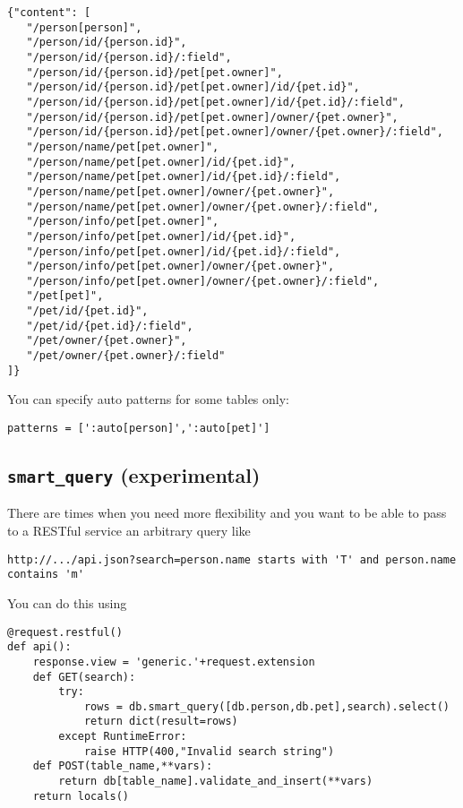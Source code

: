 \documentclass[justified,sixbynine,notoc]{tufte-book}
\def\ft{\small\tt}
\def\inxx#1{\index{#1}}
\begin{document}
\begin{fullwidth}
\begin{lstlisting}
{"content": [
   "/person[person]",
   "/person/id/{person.id}",
   "/person/id/{person.id}/:field",
   "/person/id/{person.id}/pet[pet.owner]",
   "/person/id/{person.id}/pet[pet.owner]/id/{pet.id}",
   "/person/id/{person.id}/pet[pet.owner]/id/{pet.id}/:field",
   "/person/id/{person.id}/pet[pet.owner]/owner/{pet.owner}",
   "/person/id/{person.id}/pet[pet.owner]/owner/{pet.owner}/:field",
   "/person/name/pet[pet.owner]",
   "/person/name/pet[pet.owner]/id/{pet.id}",
   "/person/name/pet[pet.owner]/id/{pet.id}/:field",
   "/person/name/pet[pet.owner]/owner/{pet.owner}",
   "/person/name/pet[pet.owner]/owner/{pet.owner}/:field",
   "/person/info/pet[pet.owner]",
   "/person/info/pet[pet.owner]/id/{pet.id}",
   "/person/info/pet[pet.owner]/id/{pet.id}/:field",
   "/person/info/pet[pet.owner]/owner/{pet.owner}",
   "/person/info/pet[pet.owner]/owner/{pet.owner}/:field",
   "/pet[pet]",
   "/pet/id/{pet.id}",
   "/pet/id/{pet.id}/:field",
   "/pet/owner/{pet.owner}",
   "/pet/owner/{pet.owner}/:field"
]}
\end{lstlisting}

You can specify auto patterns for some tables only:

\begin{lstlisting}
patterns = [':auto[person]',':auto[pet]']
\end{lstlisting}

\goodbreak\subsection{{\ft smart\_query} (experimental)}

\inxx{smart\_query}

There are times when you need more flexibility and you want to be able to pass to a RESTful service an arbitrary query like

\begin{lstlisting}[keywords={}]
http://.../api.json?search=person.name starts with 'T' and person.name contains 'm'
\end{lstlisting}

You can do this using

\begin{lstlisting}
@request.restful()
def api():
    response.view = 'generic.'+request.extension
    def GET(search):
        try:
            rows = db.smart_query([db.person,db.pet],search).select()
            return dict(result=rows)
        except RuntimeError:
            raise HTTP(400,"Invalid search string")
    def POST(table_name,**vars):
        return db[table_name].validate_and_insert(**vars)
    return locals()
\end{lstlisting}


\end{fullwidth}
\end{document}
